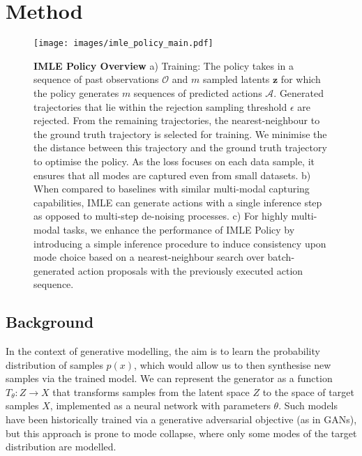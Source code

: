





\section{Method}

\begin{figure*}[t]
    \centering
    \texttt{[image: images/imle\_policy\_main.pdf]}
    \caption{\textbf{IMLE Policy Overview}  a) Training: The policy takes in a sequence of past observations $\mathcal{O}$ and $m$ sampled latents $\textbf{z}$ for which the policy generates $m$ sequences of predicted actions $\mathcal{A}$. Generated trajectories that lie within the rejection sampling threshold $\epsilon$ are rejected. From the remaining trajectories, the nearest-neighbour to the ground truth trajectory is selected for training. We minimise the the distance between this trajectory and the ground truth trajectory to optimise the policy. As the loss focuses on each data sample, it ensures that all modes are captured even from small datasets. b) When compared to baselines with similar multi-modal capturing capabilities, IMLE can generate actions with a single inference step as opposed to multi-step de-noising processes. c) For highly multi-modal tasks, we enhance the performance of IMLE Policy by introducing a simple inference procedure to induce consistency upon mode choice based on a nearest-neighbour search over batch-generated action proposals with the previously executed action sequence.}
    \label{fig:enter-label}
\end{figure*}



\subsection{Background}
In the context of generative modelling, the aim is to learn the probability distribution of samples $p(x)$, which would allow us to then synthesise new samples via the trained model. We can represent the generator as a function $T_\theta : Z \rightarrow X$ that transforms samples from the latent space $Z$ to the space of target samples $X$, implemented as a neural network with parameters $\theta$. Such models have been historically trained via a generative adversarial objective (as in GANs), but this approach is prone to mode collapse, where only some modes of the target distribution are modelled.

